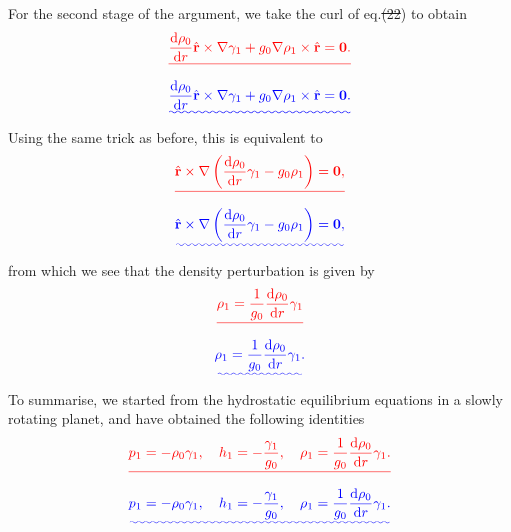 \documentclass[a4paper,12pt]{paper}
\providecommand{\DIFadd}[1]{{\protect\color{blue}\uwave{#1}}} %
\providecommand{\DIFdel}[1]{{\protect\color{red}\sout{#1}}}                      %
\providecommand{\DIFaddbegin}{} %
\providecommand{\DIFaddend}{} %
\providecommand{\DIFdelbegin}{} %
\providecommand{\DIFdelend}{} %
\begin{document}
For the second stage of the argument, we take the curl of eq.\DIFdelbegin \DIFdel{(22}\DIFdelend \DIFaddbegin \DIFadd{~(\ref{eq:22}}\DIFaddend ) to obtain
\DIFdelbegin \begin{displaymath}
\DIFdel{\frac{\ddns \rho_{0}}{\ddns r}\hat{\mathbf{r}}\times\nabla\gamma_{1}+g_{0}\nabla\rho_{1}\times\hat{\mathbf{r}}=\mathbf{0}.
}\end{displaymath}%
\DIFdelend \DIFaddbegin \begin{equation}
\DIFadd{\frac{\ddns \rho_{0}}{\ddns r}\hat{\mathbf{r}}\times\nabla\gamma_{1}+g_{0}\nabla\rho_{1}\times\hat{\mathbf{r}}=\mathbf{0}.
\label{eq:32}
}\end{equation}\DIFaddend 
Using the same trick as before, this is equivalent to
\DIFdelbegin \begin{displaymath}
\DIFdel{\hat{\mathbf{r}}\times\nabla\left(\frac{\ddns \rho_{0}}{\ddns r}\gamma_{1}-g_{0}\rho_{1}\right)=\mathbf{0},
}\end{displaymath}%
\DIFdelend \DIFaddbegin \begin{equation}
\DIFadd{\hat{\mathbf{r}}\times\nabla\left(\frac{\ddns \rho_{0}}{\ddns r}\gamma_{1}-g_{0}\rho_{1}\right)=\mathbf{0},
\label{eq:33}
}\end{equation}\DIFaddend 
from which we see that the density perturbation is given by
\DIFdelbegin \begin{displaymath}
\DIFdel{\rho_{1}=\frac{1}{g_{0}}\frac{\ddns \rho_{0}}{\ddns r}\gamma_{1}
}\end{displaymath}%
\DIFdelend \DIFaddbegin \begin{equation}
\DIFadd{\rho_{1}=\frac{1}{g_{0}}\frac{\ddns \rho_{0}}{\ddns r}\gamma_{1}.
\label{eq:34}
}\end{equation}\DIFaddend 
To summarise, we started from the hydrostatic equilibrium equations in a slowly rotating planet, and have obtained the following identities
\DIFdelbegin \begin{displaymath}
\DIFdel{p_{1}=-\rho_{0}\gamma_{1}, \quad h_{1}=-\frac{\gamma_{1}}{g_{0}}, \quad \rho_{1}=\frac{1}{g_{0}}\frac{\ddns \rho_{0}}{\ddns r}\gamma_{1}.
}\end{displaymath}%
\DIFdelend \DIFaddbegin \begin{equation}
\DIFadd{p_{1}=-\rho_{0}\gamma_{1}, \quad h_{1}=-\frac{\gamma_{1}}{g_{0}}, \quad \rho_{1}=\frac{1}{g_{0}}\frac{\ddns \rho_{0}}{\ddns r}\gamma_{1}.
\label{eq:35}
}\end{equation}\DIFaddend 
\end{document}

